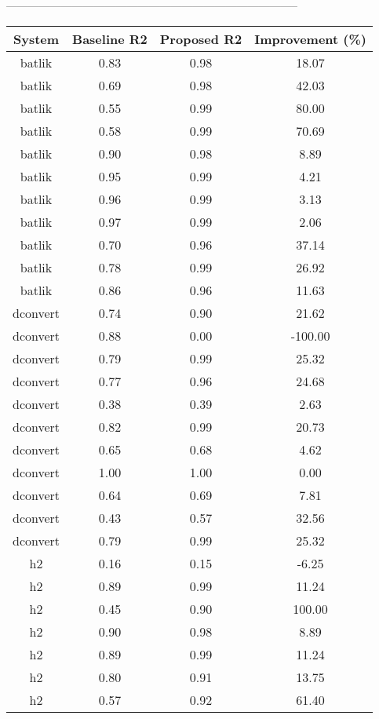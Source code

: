 --------------------------------------------------------------------------------
\begin{table}[h]
    \centering
    \begin{tabular}{|c|c|c|c|}
        \hline
        System & Baseline R2 & Proposed R2 & Improvement (\%) \\
        \hline
        batlik & 0.83 & 0.98 & 18.07 \\
        batlik & 0.69 & 0.98 & 42.03 \\
        batlik & 0.55 & 0.99 & 80.00 \\
        batlik & 0.58 & 0.99 & 70.69 \\
        batlik & 0.90 & 0.98 & 8.89 \\
        batlik & 0.95 & 0.99 & 4.21 \\
        batlik & 0.96 & 0.99 & 3.13 \\
        batlik & 0.97 & 0.99 & 2.06 \\
        batlik & 0.70 & 0.96 & 37.14 \\
        batlik & 0.78 & 0.99 & 26.92 \\
        batlik & 0.86 & 0.96 & 11.63 \\
        dconvert & 0.74 & 0.90 & 21.62 \\
        dconvert & 0.88 & 0.00 & -100.00 \\
        dconvert & 0.79 & 0.99 & 25.32 \\
        dconvert & 0.77 & 0.96 & 24.68 \\
        dconvert & 0.38 & 0.39 & 2.63 \\
        dconvert & 0.82 & 0.99 & 20.73 \\
        dconvert & 0.65 & 0.68 & 4.62 \\
        dconvert & 1.00 & 1.00 & 0.00 \\
        dconvert & 0.64 & 0.69 & 7.81 \\
        dconvert & 0.43 & 0.57 & 32.56 \\
        dconvert & 0.79 & 0.99 & 25.32 \\
        h2 & 0.16 & 0.15 & -6.25 \\
        h2 & 0.89 & 0.99 & 11.24 \\
        h2 & 0.45 & 0.90 & 100.00 \\
        h2 & 0.90 & 0.98 & 8.89 \\
        h2 & 0.89 & 0.99 & 11.24 \\
        h2 & 0.80 & 0.91 & 13.75 \\
        h2 & 0.57 & 0.92 & 61.40 \\

\end{tabular}
\end{table}
